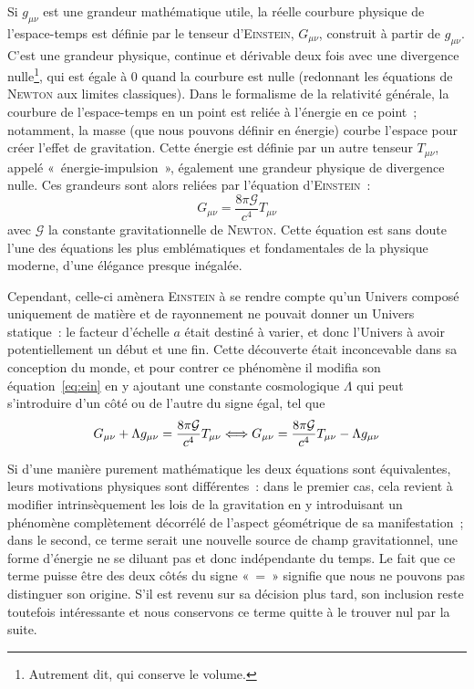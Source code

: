 \documentclass[../main/main.tex]{subfiles}
\begin{document}
Si $g_{\mu\nu}$ est une grandeur mathématique utile, la réelle courbure physique
de l'espace-temps est définie par le tenseur d'\textsc{Einstein}, $G_{\mu\nu}$,
construit à partir de $g_{\mu\nu}$. C'est une grandeur physique, continue et
dérivable deux fois avec une divergence nulle\footnote{Autrement dit, qui
conserve le volume.}, qui est égale à 0 quand la courbure est nulle (redonnant
les équations de \textsc{Newton} aux limites classiques). Dans le formalisme de
la relativité générale, la courbure de l'espace-temps en un point est reliée à
l'énergie en ce point~; notamment, la masse (que nous pouvons définir en
énergie) courbe l'espace pour créer l'effet de gravitation. Cette énergie est
définie par un autre tenseur $T_{\mu\nu}$, appelé «~énergie-impulsion~»,
également une grandeur physique de divergence nulle. Ces grandeurs sont alors
reliées par l'équation d'\textsc{Einstein}~:
\begin{equation}\label{eq:ein}
    G_{\mu\nu} = \frac{8\pi\mathcal{G}}{c^4}T_{\mu\nu}
\end{equation}
avec $\mathcal{G}$ la constante gravitationnelle de \textsc{Newton}. Cette
équation est sans doute l'une des équations les plus emblématiques et
fondamentales de la physique moderne, d'une élégance presque inégalée.

Cependant, celle-ci amènera \textsc{Einstein} à se rendre compte qu'un
Univers composé uniquement de matière et de rayonnement ne pouvait donner un
Univers statique~: le facteur d'échelle $a$ était destiné à varier, et donc
l'Univers à avoir potentiellement un début et une fin. Cette découverte était
inconcevable dans sa conception du monde, et pour contrer ce phénomène il
modifia son équation~\ref{eq:ein} en y ajoutant une constante cosmologique
$\Lambda$ qui peut s'introduire d'un côté ou de l'autre du signe égal, tel que
\begin{equation}\label{eq:einlamb}
    G_{\mu\nu} + \Lambda g_{\mu\nu} = \frac{8\pi\mathcal{G}}{c^4}T_{\mu\nu}
    \Longleftrightarrow
    G_{\mu\nu} = \frac{8\pi\mathcal{G}}{c^4}T_{\mu\nu} - \Lambda g_{\mu\nu} 
\end{equation}

Si d'une manière purement mathématique les deux équations sont équivalentes,
leurs motivations physiques sont différentes~: dans le premier cas, cela revient
à modifier intrinsèquement les lois de la gravitation en y introduisant un
phénomène complètement décorrélé de l'aspect géométrique de sa manifestation~;
dans le second, ce terme serait une nouvelle source de champ gravitationnel, une
forme d'énergie ne se diluant pas et donc indépendante du temps. Le fait que ce
terme puisse être des deux côtés du signe «~=~» signifie que nous ne pouvons pas
distinguer son origine. S'il est revenu sur sa décision plus tard, son inclusion
reste toutefois intéressante et nous conservons ce terme quitte à le trouver
nul par la suite.
\end{document}
